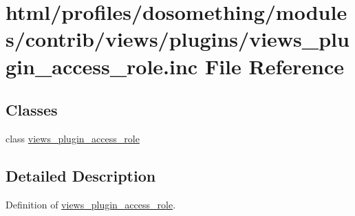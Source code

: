 \hypertarget{views__plugin__access__role_8inc}{
\section{html/profiles/dosomething/modules/contrib/views/plugins/views\_\-plugin\_\-access\_\-role.inc File Reference}
\label{views__plugin__access__role_8inc}
}
\subsection*{Classes}
\begin{DoxyCompactItemize}
\item 
class \hyperlink{classviews__plugin__access__role}{views\_\-plugin\_\-access\_\-role}
\end{DoxyCompactItemize}


\subsection{Detailed Description}
Definition of \hyperlink{classviews__plugin__access__role}{views\_\-plugin\_\-access\_\-role}. 